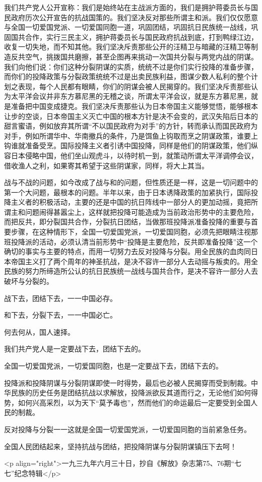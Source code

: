 我们共产党人公开宣称：我们是始终站在主战派方面的，我们是拥护蒋委员长与国民政府历次公开宣告的抗战国策的。我们坚决反对那些所谓主和派。我们仅仅愿意与全国一切爱国党派、一切爱国同胞一道，巩固团结，巩固抗日民族统一战线，巩固国共合作，实行三民主义，拥护蒋委员长与国民政府抗战到底，打到鸭绿江边，收复一切失地，而不知其他。我们坚决斥责那些公开的汪精卫与暗藏的汪精卫等制造反共空气，挑拨国共磨擦，甚至企图再来挑动一次国共分裂与两党内战的阴谋。我们向他们说：你们这种分裂阴谋的实质，统统不过是你们实行投降的准备步骤，而你们的投降政策与分裂政策统统不过是出卖民族利益，图谋少数人私利的整个计划之表现，每个人民都有眼睛，你们的阴谋会被人民揭穿的。我们坚决斥责那些认为太平洋会议并非东方慕尼黑的无稽之谈，所谓太平洋会议，就是东方慕尼黑，就是准备把中国变成捷克。我们坚决斥责那些认为日本帝国主义能够觉悟，能够根本让步的空谈，日本帝国主义灭亡中国的根本方针是决不会变的，武汉失陷后日本的甜言蜜语，例如放弃其所谓“不以国民政府为对手”的方针，转而承认而国民政府为对手，例如所谓华中、华南撤兵的条件，乃是饵鱼上钩取而烹之阴谋政策，谁要上钩谁就准备受烹。国际投降主义者引诱中国投降，同样是他们的阴谋政策，他们纵容日本侵略中国，他们坐山观虎斗，以待时机一到，就策动所谓太平洋调停会议，借收渔人之利，如果寄其希望于这些阴谋家，同样，将大上其当。

战与不战的问题，如今改成了战与和的问题，但性质还是一样，这是一切问题中的第一个大问题，最根本的问题。半年以来，由于日本诱降政策的加紧执行，国际投降主义者的积极活动，主要的还是中国的抗日阵线中一部分人的更加动摇，竟把所谓主和问题闹得甚嚣尘上，这样就把投降可能造成为当前政治形势中的主要危险，而把反共，即分裂国共合作，分裂抗日团结，当做那班投降派准备投降的重要与首要步骤，在这种情形下，全国一切爱国党派，一切爱国同胞，必须先把眼睛注视那班投降派的活动，必须认清当前形势中“投降是主要危险，反共即准备投降”这一个确切的事实与主要的特点，而用一切努力去反对投降与分裂。用全民族的血肉同日本帝国主义打了两个周年的神圣抗战，是决不容许一部分人去动摇与叛卖的。用全民族的努力所缔造所公认的抗日民族统一战线与国共合作，是决不容许一部分人去破坏与分裂的。

战下去，团结下去，一一中国必存。

和下去，分裂下去，一一中国必亡。

何去何从，国人速择。

我们共产党人是一定要战下去，团结下去的。

全国一切爱国党派，一切爱国同胞，也是一定要战下去，团结下去的。

投降派和投降阴谋与分裂阴谋即使一时得势，最后也必被人民揭穿而受到制裁。中华民族的历史任务是团结抗战以求解放，投降派欲反其道而行之，无论他们如何得势，如何兴高采烈，以为天下“莫予毒也”，然而他们的命运最后一定要受到全国人民的制裁。

反对投降与分裂一一这就是全国一切爱国党派，一切爱国同胞的当前紧急任务。

全国人民团结起来，坚持抗战与团结，把投降阴谋与分裂阴谋镇压下去呵！

<p align="right">一九三九年六月三十日，抄自《解放》杂志第75、76期“七七”纪念特辑</p>

